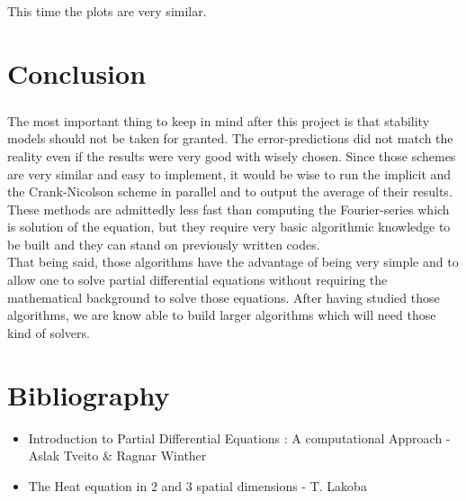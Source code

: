 \documentclass[a4paper, twoside, 11pt]{report}
\theoremstyle{theorem}
\theoremstyle{remark}
\theoremstyle{exemple}
\begin{document}
            \paragraph{}This time the plots are very similar.


\chapter*{Conclusion}

    \paragraph{}The most important thing to keep in mind after this project is that stability models should not be taken for granted. The error-predictions did not match the reality even if the results were very good with wisely chosen. Since those schemes are very similar and easy to implement, it would be wise to run the implicit and the Crank-Nicolson scheme in parallel and to output the average of their results. These methods are admittedly less fast than computing the Fourier-series which is solution of the equation, but they require very basic algorithmic knowledge to be built and they can stand on previously written codes.\\
    That being said, those algorithms have the advantage of being very simple and to allow one to solve partial differential equations without requiring the mathematical background to solve those equations. After having studied those algorithms, we are know able to build larger algorithms which will need those kind of solvers.




\chapter*{Bibliography}

    \begin{itemize}

        \item{Introduction to Partial Differential Equations : A computational Approach - Aslak Tveito \& Ragnar Winther}
        \item{The Heat equation in 2 and 3 spatial dimensions - T. Lakoba}

    \end{itemize}
\end{document}
